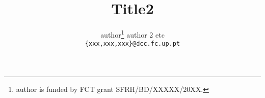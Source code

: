 \documentclass[11pt,twoside]{article}
\makeatletter
\def\cleardoublepage{\clearpage\if@twoside \ifodd\c@page\else%
\hbox{}%
\thispagestyle{empty}
\newpage%
\if@twocolumn\hbox{}\newpage\fi\fi\fi}
\makeatother
\begin{document}


\mkcoverpage

\title{Title2}
\author{author\thanks{author is funded by FCT grant
SFRH/BD/XXXXX/20XX.}\hspace{0.5cm} author 2 \hspace{0.5cm}
etc\\ {\tt \{xxx,xxx,xxx\}@dcc.fc.up.pt}}

\date{}
\cleardoublepage

\maketitle
\end{document}
